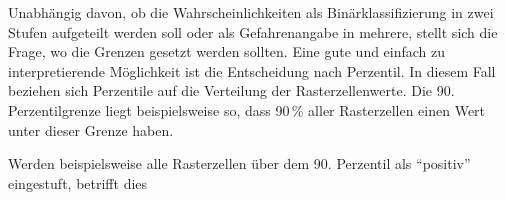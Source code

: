 Unabhängig davon, ob die Wahrscheinlichkeiten als Binärklassifizierung in zwei Stufen aufgeteilt werden soll oder als Gefahrenangabe in mehrere, stellt sich die Frage, wo die Grenzen gesetzt werden sollten.
Eine gute und einfach zu interpretierende Möglichkeit ist die Entscheidung nach Perzentil.
In diesem Fall beziehen sich Perzentile auf die Verteilung der Rasterzellenwerte.
Die 90. Perzentilgrenze liegt beispielsweise so, dass 90\,\% aller Rasterzellen einen Wert unter dieser Grenze haben.

Werden beispielsweise alle Rasterzellen über dem 90. Perzentil als "`positiv"' eingestuft, betrifft dies 

